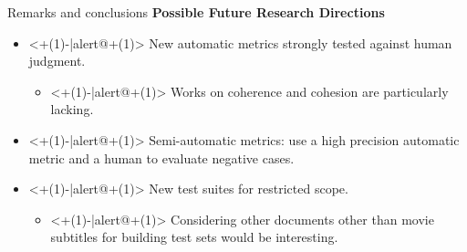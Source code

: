 \begin{frame}{Remarks and conclusions}
	\textbf{Possible Future Research Directions}
	\begin{itemize}
		\item<+(1)-|alert@+(1)> New automatic metrics strongly tested against human judgment.
			\begin{itemize}
				\item<+(1)-|alert@+(1)> Works on coherence and cohesion are particularly lacking.
			\end{itemize}
		\item<+(1)-|alert@+(1)> Semi-automatic metrics: use a high precision automatic metric and a human to evaluate negative cases.
		\item<+(1)-|alert@+(1)> New test suites for restricted scope.
			\begin{itemize}
				\item<+(1)-|alert@+(1)> Considering other documents other than movie subtitles for building test sets would be interesting. 
			\end{itemize}
	\end{itemize}
\end{frame}



		


